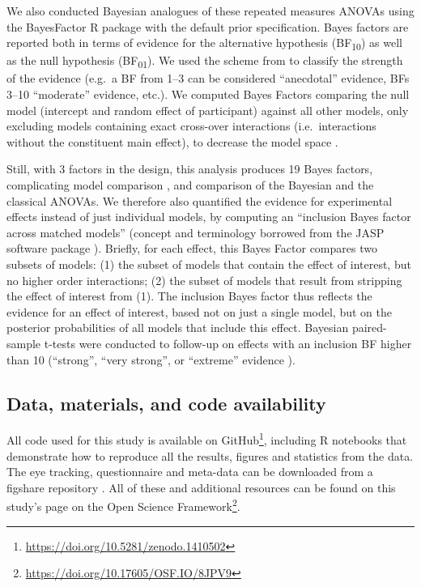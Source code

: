 \documentclass[11pt,english,]{memoir}
\let\rmarkdownfootnote\footnote%
\def\footnote{\protect\rmarkdownfootnote}
\renewcommand{\href}[2]{#2\footnote{\url{#1}}} %
\begin{document}
We also conducted Bayesian analogues of these repeated measures ANOVAs \autocites{Rouder2012}{Rouder2016} using the BayesFactor R package \autocite{R-BayesFactor} with the default prior specification. Bayes factors are reported both in terms of evidence for the alternative hypothesis (BF\textsubscript{10}) as well as the null hypothesis (BF\textsubscript{01}). We used the scheme from \textcite{Wagenmakers2018} to classify the strength of the evidence (e.g.~a BF from 1--3 can be considered ``anecdotal'' evidence, BFs 3--10 ``moderate'' evidence, etc.). We computed Bayes Factors comparing the null model (intercept and random effect of participant) against all other models, only excluding models containing exact cross-over interactions (i.e.~interactions without the constituent main effect), to decrease the model space \autocite{Rouder2016}.

Still, with 3 factors in the design, this analysis produces 19 Bayes factors, complicating model comparison \autocite{Wagenmakers2018}, and comparison of the Bayesian and the classical ANOVAs. We therefore also quantified the evidence for experimental effects instead of just individual models, by computing an ``inclusion Bayes factor across matched models'' (concept and terminology borrowed from the JASP software package \autocite{JASPTeam2018}). Briefly, for each effect, this Bayes Factor compares two subsets of models: (1) the subset of models that contain the effect of interest, but no higher order interactions; (2) the subset of models that result from stripping the effect of interest from (1). The inclusion Bayes factor thus reflects the evidence for an effect of interest, based not on just a single model, but on the posterior probabilities of all models that include this effect. Bayesian paired-sample t-tests were conducted to follow-up on effects with an inclusion BF higher than 10 (``strong'', ``very strong'', or ``extreme'' evidence \autocite{Wagenmakers2018}).

\hypertarget{data-materials-and-code-availability}{%
\subsection{Data, materials, and code availability}\label{data-materials-and-code-availability}}

All code used for this study is available \href{https://doi.org/10.5281/zenodo.1410502}{on GitHub}, including R notebooks \autocite{R-knitr} that demonstrate how to reproduce all the results, figures and statistics from the data. The eye tracking, questionnaire and meta-data can be downloaded from a figshare repository \autocite{Reteig2018}. All of these and additional resources can be found on this study's page \href{https://doi.org/10.17605/OSF.IO/8JPV9}{on the Open Science Framework}.
\end{document}

